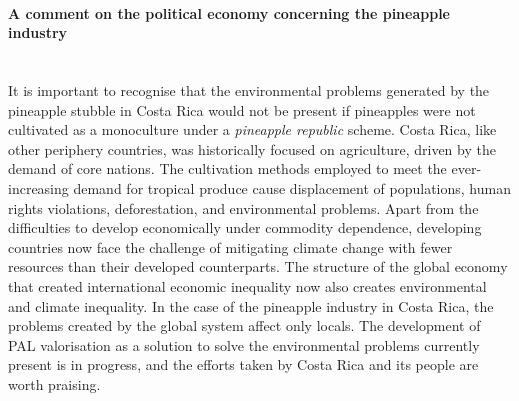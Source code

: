 \paragraph{A comment on the political economy concerning the pineapple industry}\mbox{}\\
It is important to recognise that the environmental problems generated by the pineapple stubble in Costa Rica would not be present if pineapples were not cultivated as a monoculture under a \textit{pineapple republic} scheme. Costa Rica, like other periphery countries, was historically focused on agriculture, driven by the demand of core nations. The cultivation methods employed to meet the ever-increasing demand for tropical produce cause displacement of populations, human rights violations, deforestation, and environmental problems. Apart from the difficulties to develop economically under commodity dependence, developing countries now face the challenge of mitigating climate change with fewer resources than their developed counterparts. The structure of the global economy that created international economic inequality now also creates environmental and climate inequality. In the case of the pineapple industry in Costa Rica, the problems created by the global system affect only locals. The development of PAL valorisation as a solution to solve the environmental problems currently present is in progress, and the efforts taken by Costa Rica and its people are worth praising. 

